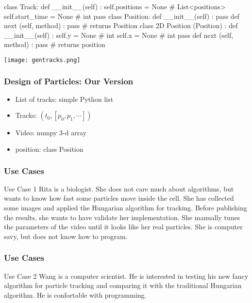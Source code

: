 \begin{frame}[fragile]
\begin{python}
class Track:
    def __init__(self) :
        self.positions = None # List<positions>
        self.start_time = None # int
        pass
class Position:
    def __init__(self) :
        pass
    def next (self, method) :
        pass # returns Position
class 2D Position (Position) :
    def __init__(self) :
        self.y = None # int
        self.x = None # int
        pass
    def next (self, method) :
        pass # returns position
\end{python}
\end{frame}

\begin{frame}[fragile]

\centering
\texttt{[image: gentracks.png]}

\end{frame}

\begin{frame}[fragile]
\frametitle{Design of Particles: Our Version}

\begin{itemize}
\item List of tracks: simple Python list
\item Tracks: $(t_0,[p_0,p_1,\cdots])$
\item Video: numpy 3-d array
\item position: class Position
\end{itemize}
\end{frame}


\begin{frame}[fragile]
\frametitle{Use Cases}
\begin{block}{Use Case 1}
Rita is a biologist. She does not care much about algorithms, but wants to know how
fast some particles move inside the cell. She has collected some images and applied
the Hungarian algorithm for tracking. Before publishing the results, she wants to have
validate her implementation. She manually tunes the parameters of the video until it looks 
like her real particles. She is computer savy, but does not know how to program.
\end{block}
\end{frame}

\begin{frame}[fragile]
\frametitle{Use Cases}
\begin{block}{Use Case 2}
Wang is a computer scientist. He is interested in testing his new fancy algorithm for
particle tracking and comparing it with the traditional Hungarian algorithm. He is confortable
with programming.
\end{block}
\end{frame}


